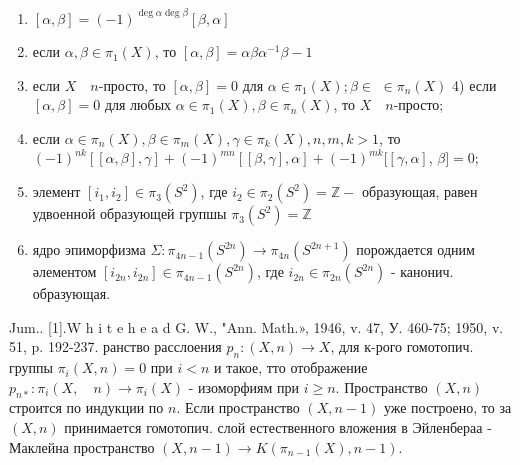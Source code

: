 \documentclass[10pt]{article}
\begin{document}
\begin{enumerate}

  \item $[\alpha, \beta]=(-1)^{\operatorname{deg} \alpha \operatorname{deg} \beta}[\beta, \alpha]$



  \item если $\alpha, \beta \in \pi_{1}(X)$, то $[\alpha, \beta]=\alpha \beta \alpha^{-1} \beta-1$



  \item если $X \quad n$-просто, то $[\alpha, \beta]=0$ для $\alpha \in \pi_{1}(X) ; \beta \in$ $\in \pi_{n}(X)$ 4) если $[\alpha, \beta]=0$ для любых $\alpha \in \pi_{1}(X), \beta \in \pi_{n}(X)$, то $X \quad n$-просто;



  \item если $\alpha \in \pi_{n}(X), \beta \in \pi_{m}(X), \gamma \in \pi_{k}(X), n, m, k>1$, то $(-1)^{n k}[[\alpha, \beta], \gamma]+(-1)^{m n}[[\beta, \gamma], \alpha]+(-1)^{m k}[[\gamma, \alpha]$, $\beta]=0$;



  \item элемент $\left[i_{1}, i_{2}\right] \in \pi_{3}\left(S^{2}\right)$, где $i_{2} \in \pi_{2}\left(S^{2}\right)=\mathbb{Z}-$ образующая, равен удвоенной образующей групшы $\pi_{3}\left(S^{2}\right)=\mathbb{Z}$



  \item ядро эпиморфизма $\Sigma: \pi_{4 n-1}\left(S^{2 n}\right) \rightarrow \pi_{4 n}\left(S^{2 n+1}\right)$ порождается одним әлементом $\left[i_{2 n}, i_{2 n}\right] \in \pi_{4 n-1}\left(S^{2 n}\right)$, где $i_{2 n} \in \pi_{2 n}\left(S^{2 n}\right)$ - канонич. образующая.



\end{enumerate}



Jum.. [1].W h i t e h e a d G. W., "Ann. Math.», 1946, v. 47, У. 460-75; 1950, v. 51, p. 192-237. ранство расслоения $p_{n}:(X, n) \rightarrow X$, для к-рого гомотопич. группы $\pi_{i}(X, n)=0$ при $i<n$ и такое, тто отображение $p_{n *}: \pi_{i}(X, \quad n) \rightarrow \pi_{i}(X)$ - изоморфиям при $i \geqslant n$. Пространство $(X, n)$ строится по индукции по $n$. Если пространство $(X, n-1)$ уже построено, то за $(X, n)$ принимается гомотопич. слой естественного вложения в Эйленбераа - Маклейна пространство $(X, n-1) \longrightarrow K\left(\pi_{n-1}(X), n-1\right)$.
\end{document}

